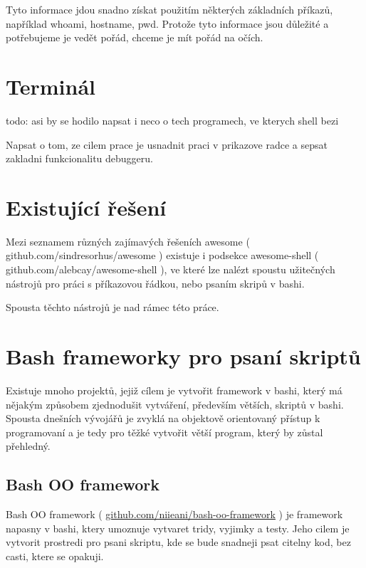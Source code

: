 \documentclass[thesis=M,czech]{FITthesis}[2012/06/26]
\begin{document}
Tyto informace jdou snadno získat použitím některých základních příkazů, například whoami, hostname, pwd. Protože tyto informace jsou důležité a potřebujeme je vedět pořád, chceme je mít pořád na očích.

\section{Terminál}
todo: asi by se hodilo napsat i neco o tech programech, ve kterych shell bezi



Napsat o tom, ze cilem prace je usnadnit praci v prikazove radce a sepsat zakladni funkcionalitu debuggeru.





\section{Existující řešení}

Mezi seznamem různých zajímavých řešeních awesome ( github.com/sindresorhus/awesome ) existuje i podsekce awesome-shell ( github.com/alebcay/awesome-shell ), ve které lze nalézt spoustu užitečných nástrojů pro práci s příkazovou řádkou, nebo psaním skripů v bashi.

Spousta těchto nástrojů je nad rámec této práce. 


\section{Bash frameworky pro psaní skriptů}

Existuje mnoho projektů, jejiž cílem je vytvořit framework v bashi, který má nějakým způsobem zjednodušit vytváření, především větších, skriptů v bashi. Spousta dnešních vývojářů je zvyklá na objektově orientovaný přístup k programovaní a je tedy pro těžké vytvořit větší program, který by zůstal přehledný.

\subsection{Bash OO framework}
Bash OO framework ( \url{github.com/niieani/bash-oo-framework} ) je framework napasny v bashi, ktery umoznuje vytvaret tridy, vyjimky a testy. Jeho cilem je vytvorit prostredi pro psani skriptu, kde se bude snadneji psat citelny kod, bez casti, ktere se opakuji.
\end{document}
